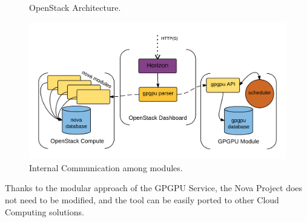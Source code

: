 \documentclass[a4paper,twoside]{article}
\begin{document}
\begin{figure}[htb]
  \centering
   \quad
  \caption{OpenStack Architecture.}
  \label{fig:os}
\end{figure}

\begin{figure}[htb]
  \centering
  \includegraphics[width=\linewidth]{images/os2.png}
  \caption{Internal Communication among modules.}
  \label{fig:internal}
\end{figure}

Thanks to the modular approach of the GPGPU Service, the Nova Project does not need to be modified, and the tool can be easily ported to other Cloud Computing solutions.
\end{document}
